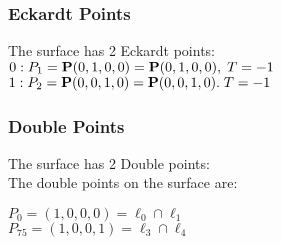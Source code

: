 \documentclass{article}
\newcommand{\bP}{{\bf P}}
\begin{document}
{\subsubsection*{Eckardt Points}
The surface has 2 Eckardt points:\\
$0 : P_{1}=\bP(0, 1, 0, 0) = \bP(0, 1, 0, 0),\; T= -1$\\
$1 : P_{2}=\bP(0, 0, 1, 0) = \bP(0, 0, 1, 0).\; T= -1$\\
\subsubsection*{Double Points}
The surface has 2 Double points:\\
The double points on the surface are:\\
\begin{multicols}{2}
\noindent
$P_{0} = ( 1, 0, 0, 0 ) = \ell_{0} \cap \ell_{1} $\\
$P_{75} = ( 1, 0, 0, 1 ) = \ell_{3} \cap \ell_{4} $\\
\end{multicols}
}
\end{document}
